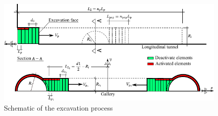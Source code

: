 \documentclass[a4paper,fleqn]{cas-sc}
\begin{document}
\begin{figure}[h!]
	\centering
	\includegraphics[scale=1.3]{Diagram of excavations.pdf}
	\caption{Schematic of the excavation process}
	\label{Diagram of excavations}
\end{figure}
\FloatBarrier
\end{document}
